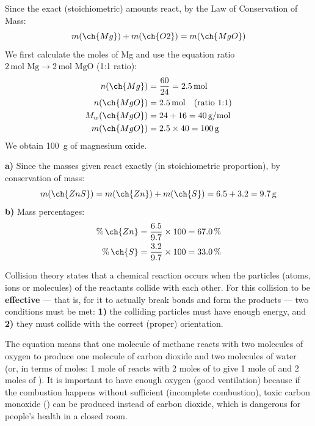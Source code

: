 \documentclass[11pt,a4paper]{article}
\begin{document}
\begin{solucioneng}
Since the exact (stoichiometric) amounts react, by the Law of Conservation of Mass:
\begin{equation*}
    m(\ch{Mg}) + m(\ch{O2}) = m(\ch{MgO})
\end{equation*}
We first calculate the moles of Mg and use the equation ratio $2\,\text{mol Mg} \rightarrow 2\,\text{mol MgO}$ (1:1 ratio):
\begin{align*}
    n(\ch{Mg}) &= \dfrac{60}{24} = 2.5\,\text{mol} \\
    n(\ch{MgO}) &= 2.5\,\text{mol} \quad (\text{ratio } 1{:}1) \\
    M_w(\ch{MgO}) &= 24 + 16 = 40\,\text{g/mol} \\
    m(\ch{MgO}) &= 2.5 \times 40 = \qty{100}{\g}
\end{align*}
We obtain \qty{100}{\g} of magnesium oxide.
\end{solucioneng}

\begin{solucioneng}
\textbf{a)} Since the masses given react exactly (in stoichiometric proportion), by conservation of mass:
\begin{equation*}
    m(\ch{ZnS}) = m(\ch{Zn}) + m(\ch{S}) = 6.5 + 3.2 = \qty{9.7}{\g}
\end{equation*}
\textbf{b)} Mass percentages:
\begin{align*}
    \%\,\ch{Zn} &= \dfrac{6.5}{9.7}\times 100 = 67.0\,\% \\
    \%\,\ch{S} &= \dfrac{3.2}{9.7}\times 100 = 33.0\,\%
\end{align*}
\end{solucioneng}

\begin{solucioneng}
Collision theory states that a chemical reaction occurs when the particles (atoms, ions or molecules) of the reactants collide with each other. For this collision to be \textbf{effective} --- that is, for it to actually break bonds and form the products --- two conditions must be met: \textbf{1)} the colliding particles must have enough energy, and \textbf{2)} they must collide with the correct (proper) orientation.
\end{solucioneng}

\begin{solucioneng}
The equation means that one molecule of methane reacts with two molecules of oxygen to produce one molecule of carbon dioxide and two molecules of water (or, in terms of moles: 1 mole of  reacts with 2 moles of  to give 1 mole of  and 2 moles of ). It is important to have enough oxygen (good ventilation) because if the combustion happens without sufficient  (incomplete combustion), toxic carbon monoxide () can be produced instead of carbon dioxide, which is dangerous for people's health in a closed room.
\end{solucioneng}
\end{document}
